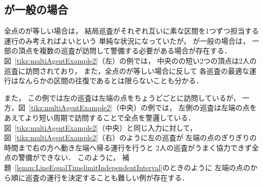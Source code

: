 
\subsection{{\maxIdletime}が一般の場合}
\label{subsec:LineDifferentTimelimit}

全点の{\maxIdletime}が等しい場合は，
結局巡査がそれぞれ互いに素な区間を1つずつ担当する運行のみ考えればよいという
単純な状況になっていたが，
{\maxIdletime}が一般の場合は，
一部の頂点を複数の巡査が訪問して警備する必要がある場合が存在する．
%
図~\ref{tikz:multiAgentExample2}（左）の例では，
中央の{\maxIdletime}の短い2つの頂点は2人の巡査に訪問されており，
また，全点の{\maxIdletime}が等しい場合に反して
各巡査の最適な運行はなんらかの区間の往復であるとは限らないことも分かる．


また，
この例では左の巡査は左端の点を{\maxIdletime}ちょうどごとに訪問しているが，
一方，図~\ref{tikz:multiAgentExample2}（中央）の例では，
左側の巡査は左端の点をあえてより短い周期で訪問することで全点を警邏している．
図~\ref{tikz:multiAgentExample2}（中央）と同じ入力に対して，
図~\ref{tikz:multiAgentExample2}（右）のように左の巡査が
左端の点の{\maxIdletime}ぎりぎりの時間まで右の方へ動き左端へ帰る運行を行うと
2人の巡査がうまく協力できず全点の警備ができない．
このように，
補題~\ref{lemm:LineEqualTimelimitIndependentInterval}のときのように
左端の点の{\maxIdletime}から順に巡査の運行を決定することも難しい例が存在する．

